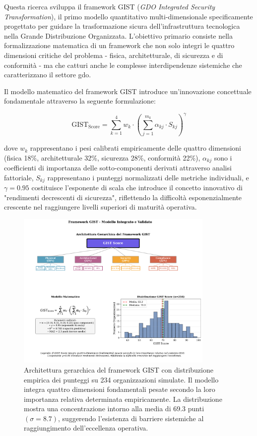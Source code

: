 Questa ricerca sviluppa il framework GIST (\textit{GDO Integrated Security Transformation}), il primo modello quantitativo multi-dimensionale specificamente progettato per guidare la trasformazione sicura dell'infrastruttura tecnologica nella Grande Distribuzione Organizzata. L'obiettivo primario consiste nella formalizzazione matematica di un framework che non solo integri le quattro dimensioni critiche del problema - fisica, architetturale, di sicurezza e di conformità - ma che catturi anche le complesse interdipendenze sistemiche che caratterizzano il settore \gls{gdo}.

Il modello matematico del framework GIST introduce un'innovazione concettuale fondamentale attraverso la seguente formulazione:

\begin{equation}
\text{GIST}_{\text{Score}} = \sum_{k=1}^{4} w_k \cdot \left( \sum_{j=1}^{m_k} \alpha_{kj} \cdot S_{kj} \right)^{\gamma}
\label{eq:gist_score}
\end{equation}

dove $w_k$ rappresentano i pesi calibrati empiricamente delle quattro dimensioni (fisica 18\%, architetturale 32\%, sicurezza 28\%, conformità 22\%), $\alpha_{kj}$ sono i coefficienti di importanza delle sotto-componenti derivati attraverso analisi fattoriale, $S_{kj}$ rappresentano i punteggi normalizzati delle metriche individuali, e $\gamma = 0.95$ costituisce l'esponente di scala che introduce il concetto innovativo di "rendimenti decrescenti di sicurezza", riflettendo la difficoltà esponenzialmente crescente nel raggiungere livelli superiori di maturità operativa.

\begin{figure}[htbp]
\centering
\includegraphics[width=0.85\textwidth]{thesis_figures/cap5/figura_5_3_gist_framework.pdf}
\caption[Architettura gerarchica del framework GIST e distribuzione empirica dei punteggi]{Architettura gerarchica del framework GIST con distribuzione empirica dei punteggi su 234 organizzazioni simulate. Il modello integra quattro dimensioni fondamentali pesate secondo la loro importanza relativa determinata empiricamente. La distribuzione mostra una concentrazione intorno alla media di 69.3 punti $(\sigma=8.7)$, suggerendo l'esistenza di barriere sistemiche al raggiungimento dell'eccellenza operativa.}
\label{fig:gist_framework}
\end{figure}

